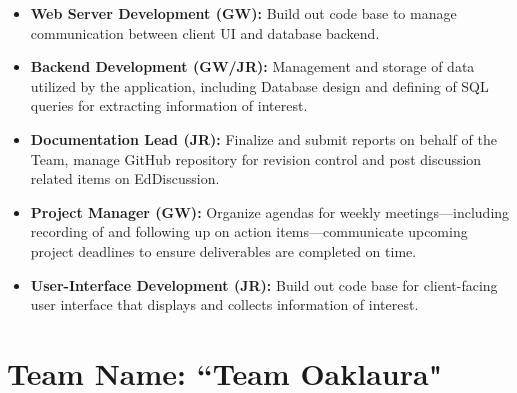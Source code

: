 \documentclass{article}
\begin{document}
\begin{tcolorbox}[colback=secondarycolor, colframe=primarycolor, title=\textbf{Role Responsibilities:}]
\begin{itemize}
  \item \textbf{Web Server Development (GW):} Build out code base to manage communication between client UI and database backend.
    
  \vspace{0.2cm}
  
  \item \textbf{Backend Development (GW/JR):} Management and storage of data utilized by the application, including Database design and defining of SQL queries for extracting information of interest.
  
  \vspace{0.2cm}
  
  \item \textbf{Documentation Lead (JR):} Finalize and submit reports on behalf of the Team, manage GitHub repository for revision control and post discussion related items on EdDiscussion.
  
  \vspace{0.2cm}
  
  \item \textbf{Project Manager (GW):} Organize agendas for weekly meetings—including recording of and following up on action items—communicate upcoming project deadlines to ensure deliverables are completed on time.
   
   \vspace{0.2cm}
    
  \item \textbf{User-Interface Development (JR):} Build out code base for client-facing user interface that displays and collects information of interest.

\end{itemize}
\end{tcolorbox}

\vspace{0.5cm}

\section{Team Name: ``Team Oaklaura"}

\vspace{0.5cm}
\end{document}
